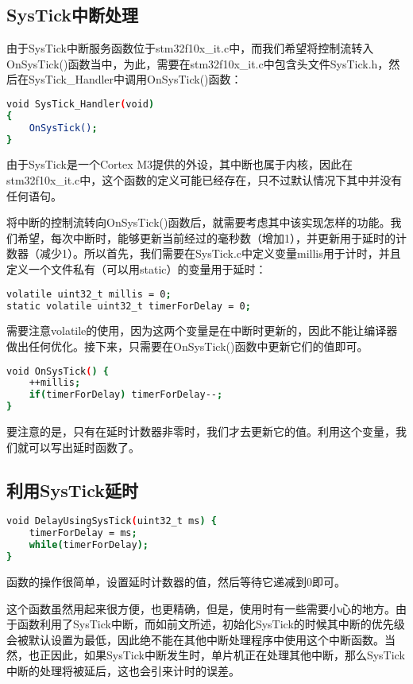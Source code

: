 	\subsection{SysTick中断处理}
	由于SysTick中断服务函数位于stm32f10x\_it.c中，而我们希望将控制流转入OnSysTick()函数当中，为此，需要在stm32f10x\_it.c中包含头文件SysTick.h，然后在SysTick\_Handler中调用OnSysTick()函数：
	\par 
	\begin{lstlisting}[language=bash, style=customStyleC, caption=SysTick\_Handler函数]
void SysTick_Handler(void)
{
	OnSysTick();
}
	\end{lstlisting}
	\par 
	由于SysTick是一个Cortex M3提供的外设，其中断也属于内核，因此在stm32f10x\_it.c中，这个函数的定义可能已经存在，只不过默认情况下其中并没有任何语句。
	\par 
	将中断的控制流转向OnSysTick()函数后，就需要考虑其中该实现怎样的功能。我们希望，每次中断时，能够更新当前经过的毫秒数（增加1），并更新用于延时的计数器（减少1）。所以首先，我们需要在SysTick.c中定义变量millis用于计时，并且定义一个文件私有（可以用static）的变量用于延时：
	\par 
	\begin{lstlisting}[language=bash, style=customStyleC, caption=用到的全局变量]
volatile uint32_t millis = 0;
static volatile uint32_t timerForDelay = 0;
	\end{lstlisting}
	\par 
	需要注意volatile的使用，因为这两个变量是在中断时更新的，因此不能让编译器做出任何优化。接下来，只需要在OnSysTick()函数中更新它们的值即可。
	\par 
	\begin{lstlisting}[language=bash, style=customStyleC, caption=OnSysTick函数]
void OnSysTick() {
	++millis;
	if(timerForDelay) timerForDelay--;
}
	\end{lstlisting}
	\par 
	要注意的是，只有在延时计数器非零时，我们才去更新它的值。利用这个变量，我们就可以写出延时函数了。
	
	\subsection{利用SysTick延时}
	\par 
	\begin{lstlisting}[language=bash, style=customStyleC, caption=延时函数]
void DelayUsingSysTick(uint32_t ms) {
	timerForDelay = ms;
	while(timerForDelay);
}
	\end{lstlisting}
	\par 
	函数的操作很简单，设置延时计数器的值，然后等待它递减到0即可。
	\par 
	这个函数虽然用起来很方便，也更精确，但是，使用时有一些需要小心的地方。由于函数利用了SysTick中断，而如前文所述，初始化SysTick的时候其中断的优先级会被默认设置为最低，因此绝不能在其他中断处理程序中使用这个中断函数。当然，也正因此，如果SysTick中断发生时，单片机正在处理其他中断，那么SysTick中断的处理将被延后，这也会引来计时的误差。

